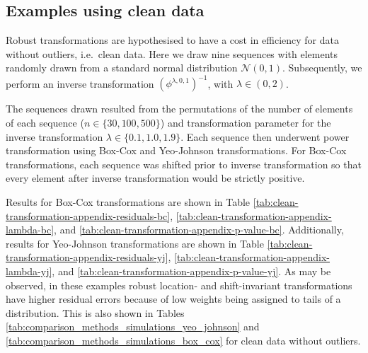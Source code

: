 \documentclass[
  a4paper,
]{article}
\begin{document}
\begin{table}
\begin{center}
\begin{tabular}{l | l r r r r r r}
\bottomrule
\end{tabular}
\end{center}
\end{table}

\FloatBarrier

\subsection{Examples using clean data}\label{examples-using-clean-data}

Robust transformations are hypothesised to have a cost in efficiency for
data without outliers, i.e.~clean data. Here we draw nine sequences with
elements randomly drawn from a standard normal distribution
\(\mathcal{N}(0,1)\). Subsequently, we perform an inverse transformation
\(\left(\phi^{\lambda, 0, 1}\right)^{-1}\), with
\(\lambda \in \left(0, 2\right)\).

The sequences drawn resulted from the permutations of the number of
elements of each sequence (\(n \in \{30, 100, 500\}\)) and
transformation parameter for the inverse transformation
\(\lambda \in \{0.1, 1.0, 1.9\}\). Each sequence then underwent power
transformation using Box-Cox and Yeo-Johnson transformations. For
Box-Cox transformations, each sequence was shifted prior to inverse
transformation so that every element after inverse transformation would
be strictly positive.

Results for Box-Cox transformations are shown in Table
\ref{tab:clean-transformation-appendix-residuals-bc},
\ref{tab:clean-transformation-appendix-lambda-bc}, and
\ref{tab:clean-transformation-appendix-p-value-bc}. Additionally,
results for Yeo-Johnson transformations are shown in Table
\ref{tab:clean-transformation-appendix-residuals-yj},
\ref{tab:clean-transformation-appendix-lambda-yj}, and
\ref{tab:clean-transformation-appendix-p-value-yj}. As may be observed,
in these examples robust location- and shift-invariant transformations
have higher residual errors because of low weights being assigned to
tails of a distribution. This is also shown in Tables
\ref{tab:comparison_methods_simulations_yeo_johnson} and
\ref{tab:comparison_methods_simulations_box_cox} for clean data without
outliers.
\end{document}
